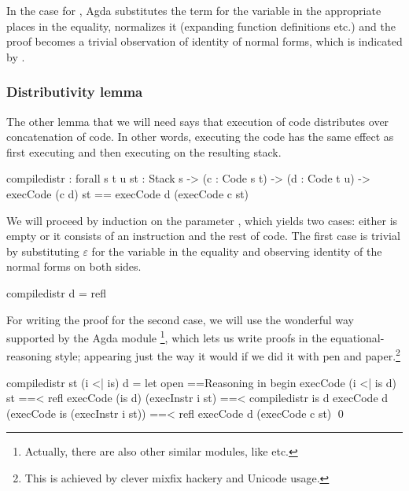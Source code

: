 \noindent In the case for , Agda substitutes the term 
for the variable  in the appropriate places in the equality, normalizes
it (expanding function definitions etc.) and the proof becomes a trivial observation of
identity of normal forms, which is indicated by .

\subsubsection{Distributivity lemma}

The other lemma that we will need says that execution of code distributes over
concatenation of code. In other words, executing the code  has the same effect as first executing  and then executing
 on the resulting stack.

\label{sec:cor-compile-distr}\begin{code}
  compile\-distr : forall {s t u} {st : Stack s}
    -> (c : Code s t) -> (d : Code t u)
    -> execCode (c \app d) st == execCode d (execCode c st)
\end{code}

\noindent We will proceed by induction on the parameter , which yields
two cases: either  is empty or it consists of an instruction and the
rest of code. The first case is trivial by substituting $\varepsilon$ for the variable
 in the equality and observing identity of the normal forms on both sides.

\begin{code}
  compile\-distr \nil d = refl
\end{code}

\noindent For writing the proof for the second case, we will use the wonderful
way supported by the Agda module \footnote{Actually,
there are also other similar modules, like  etc.}, which
lets us write proofs in the equational-reasoning style; appearing just the way
it would if we did it with pen and paper.\footnote{This is achieved by clever
mixfix hackery and Unicode usage.}

\begin{code}
  compile\-distr {st} (i <| is) d = let open ==\-Reasoning in begin
    execCode (i <| is \app d) st
      ==< refl \>
    execCode (is \app d) (execInstr i st)
      ==< compile\-distr is d \>
    execCode d (execCode is (execInstr i st))
      ==< refl \>
    execCode d (execCode c st)
    \qed
\end{code}

